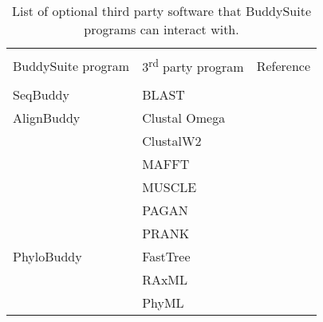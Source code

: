 \documentclass[twocolumn]{bmcart}%
\begin{document}
\begin{backmatter}
\begin{table}[h!]
\caption{List of optional third party software that BuddySuite programs can interact with.}
      \begin{tabular}{lll}
        \hline \\
	   BuddySuite program	&3\textsuperscript{rd} party program	& Reference  \\ \\
        \hline
        SeqBuddy		& BLAST 			& \cite{Camacho2009} \\
        \hline
        AlignBuddy	& Clustal Omega 	& \cite{Sievers:2011fn} \\
        					& ClustalW2 		& \cite{Larkin:2007hz} \\
						& MAFFT 			& \cite{Katoh:2013hm} \\
						& MUSCLE 			& \cite{Edgar:2004bo} \\
						& PAGAN 			& \cite{Loytynoja:2012fy} \\
        					& PRANK 			& \cite{Loytynoja:2005cb} \\				
        \hline
        PhyloBuddy	& FastTree 			& \cite{Price:2010eg} \\
        					& RAxML 			& \cite{Stamatakis:2006de} \\
        					& PhyML 			& \cite{Guindon:2010gf} \\
        \hline
      \end{tabular}
\label{table:software}
\end{table}


\end{backmatter}
\end{document}

